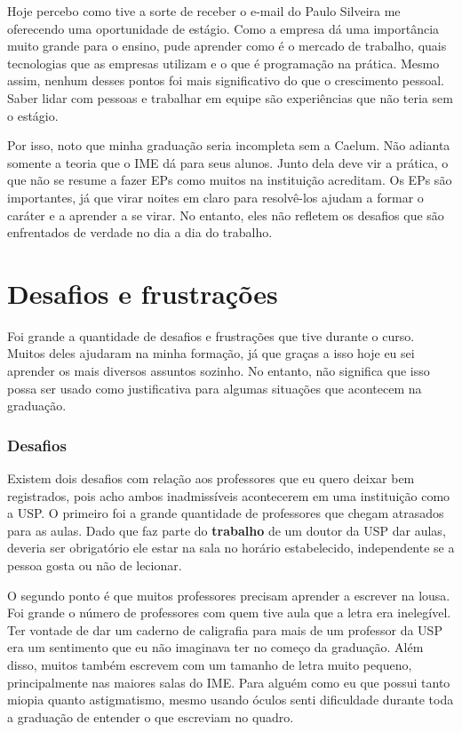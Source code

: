 \documentclass[titlepage,a4paper]{article}
\begin{document}
Hoje percebo como tive a sorte de receber o e-mail do Paulo Silveira me oferecendo uma oportunidade de estágio. Como a empresa dá uma importância muito grande para o ensino, pude aprender como é o mercado de trabalho, quais tecnologias que as empresas utilizam e o que é programação na prática. Mesmo assim, nenhum desses pontos foi mais significativo do que o crescimento pessoal. Saber lidar com pessoas e trabalhar em equipe são experiências que não teria sem o estágio.

Por isso, noto que minha graduação seria incompleta sem a Caelum. Não adianta somente a teoria que o IME dá para seus alunos. Junto dela deve vir a prática, o que não se resume a fazer EPs como muitos na instituição acreditam. Os EPs são importantes, já que virar noites em claro para resolvê-los ajudam a formar o caráter e a aprender a se virar. No entanto, eles não refletem os desafios que são enfrentados de verdade no dia a dia do trabalho.

\section{Desafios e frustrações}

Foi grande a quantidade de desafios e frustrações que tive durante o curso. Muitos deles ajudaram na minha formação, já que graças a isso hoje eu sei aprender os mais diversos assuntos sozinho. No entanto, não significa que isso possa ser usado como justificativa para algumas situações que acontecem na graduação.

\subsubsection*{Desafios}

Existem dois desafios com relação aos professores que eu quero deixar bem registrados, pois acho ambos inadmissíveis acontecerem em uma instituição como a USP. O primeiro foi a grande quantidade de professores que chegam atrasados para as aulas. Dado que faz parte do \textbf{trabalho} de um doutor da USP dar aulas, deveria ser obrigatório ele estar na sala no horário estabelecido, independente se a pessoa gosta ou não de lecionar.

O segundo ponto é que muitos professores precisam aprender a escrever na lousa. Foi grande o número de professores com quem tive aula que a letra era inelegível. Ter vontade de dar um caderno de caligrafia para mais de um professor da USP era um sentimento que eu não imaginava ter no começo da graduação. Além disso, muitos também escrevem com um tamanho de letra muito pequeno, principalmente nas maiores salas do IME. Para alguém como eu que possui tanto miopia quanto astigmatismo, mesmo usando óculos senti dificuldade durante toda a graduação de entender o que escreviam no quadro.
\end{document}
